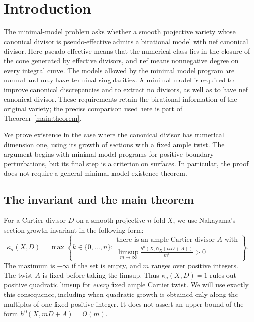 \section{Introduction}

The minimal-model problem asks whether a smooth projective variety whose
canonical divisor is pseudo-effective admits a birational model with nef
canonical divisor. Here pseudo-effective means that the numerical class lies
in the closure of the cone generated by effective divisors, and nef means
nonnegative degree on every integral curve. The models allowed by the minimal
model program are normal and may have terminal singularities. A minimal
model is required to improve canonical discrepancies and to extract no
divisors, as well as to have nef canonical divisor. These requirements retain
the birational information of the original variety; the precise comparison
used here is part of Theorem~\ref{main:theorem}.

We prove existence in the case where the canonical divisor has numerical
dimension one, using its growth of sections with a fixed ample twist. The
argument begins with minimal model programs for positive boundary
perturbations, but its final step is a criterion on surfaces. In particular,
the proof does not require a general minimal-model existence theorem.

\subsection{The invariant and the main theorem}

For a Cartier divisor \(D\) on a smooth projective \(n\)-fold \(X\),
we use Nakayama's section-growth invariant \cite{Nak04} in the following form:
\begin{equation}\label{main:sigma}
\kappa_\sigma(X,D)=
\max\left\{k\in\{0,\ldots,n\}:
\begin{array}{l}
\text{there is an ample Cartier divisor \(A\) with}\\[2pt]
\displaystyle\limsup_{m\to\infty}
\frac{h^0(X,\mathcal O_X(mD+A))}{m^k}>0
\end{array}\right\}.
\end{equation}
The maximum is \(-\infty\) if the set is empty, and \(m\) ranges over
positive integers. The twist \(A\) is fixed before taking the limsup. Thus
\(\kappa_\sigma(X,D)=1\) rules out positive quadratic limsup for
\emph{every} fixed ample Cartier twist. We will use exactly this consequence,
including when quadratic growth is obtained only along the multiples of one
fixed positive integer. It does not assert an upper bound of the form
\(h^0(X,mD+A)=O(m)\).


